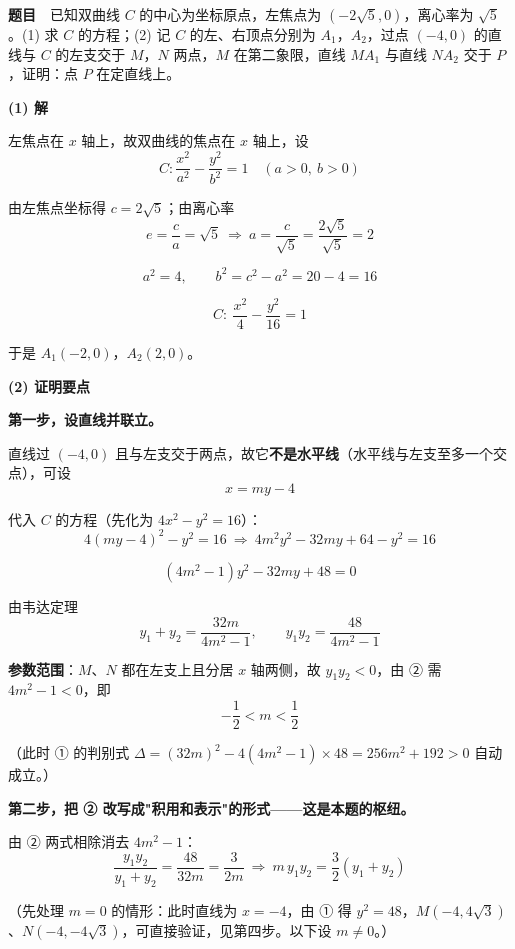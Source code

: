 \par\medskip


\textbf{题目}　已知双曲线 $C$ 的中心为坐标原点，左焦点为 $\left(-2\sqrt5,0\right)$，离心率为 $\sqrt5$。(1) 求 $C$ 的方程；(2) 记 $C$ 的左、右顶点分别为 $A_1$，$A_2$，过点 $(-4,0)$ 的直线与 $C$ 的左支交于 $M$，$N$ 两点，$M$ 在第二象限，直线 $MA_1$ 与直线 $NA_2$ 交于 $P$，证明：点 $P$ 在定直线上。

\par\medskip

\textbf{(1) 解}

左焦点在 $x$ 轴上，故双曲线的焦点在 $x$ 轴上，设
\[C:\frac{x^{2}}{a^{2}}-\frac{y^{2}}{b^{2}}=1\quad(a>0,\ b>0)\]

由左焦点坐标得 $c=2\sqrt5$；由离心率
\[e=\frac ca=\sqrt5\ \Longrightarrow\ a=\frac c{\sqrt5}=\frac{2\sqrt5}{\sqrt5}=2\]

\[a^{2}=4,\qquad b^{2}=c^{2}-a^{2}=20-4=16\]

\[\boxed{C:\ \frac{x^{2}}4-\frac{y^{2}}{16}=1}\]

于是 $A_1(-2,0)$，$A_2(2,0)$。

\par\medskip

\textbf{(2) 证明要点}

\textbf{第一步，设直线并联立。}

直线过 $(-4,0)$ 且与左支交于两点，故它\textbf{不是水平线}（水平线与左支至多一个交点），可设
\[x=my-4\]

代入 $C$ 的方程（先化为 $4x^{2}-y^{2}=16$）：
\[4(my-4)^{2}-y^{2}=16\ \Longrightarrow\ 4m^{2}y^{2}-32my+64-y^{2}=16\]

\[\left(4m^{2}-1\right)y^{2}-32my+48=0\tag{①}\]

由韦达定理
\[y_1+y_2=\frac{32m}{4m^{2}-1},\qquad y_1y_2=\frac{48}{4m^{2}-1}\tag{②}\]

\textbf{参数范围}：$M$、$N$ 都在左支上且分居 $x$ 轴两侧，故 $y_1y_2<0$，由 ② 需 $4m^{2}-1<0$，即
\[-\frac12<m<\frac12\]

（此时 ① 的判别式 $\Delta=(32m)^{2}-4\left(4m^{2}-1\right)\times48=256m^{2}+192>0$ 自动成立。）

\textbf{第二步，把 ② 改写成"积用和表示"的形式——这是本题的枢纽。}

由 ② 两式相除消去 $4m^{2}-1$：
\[\frac{y_1y_2}{y_1+y_2}=\frac{48}{32m}=\frac3{2m}\ \Longrightarrow\ m\,y_1y_2=\frac32\left(y_1+y_2\right)\tag{③}\]

（先处理 $m=0$ 的情形：此时直线为 $x=-4$，由 ① 得 $y^{2}=48$，$M\left(-4,4\sqrt3\right)$、$N\left(-4,-4\sqrt3\right)$，可直接验证，见第四步。以下设 $m\ne0$。）

